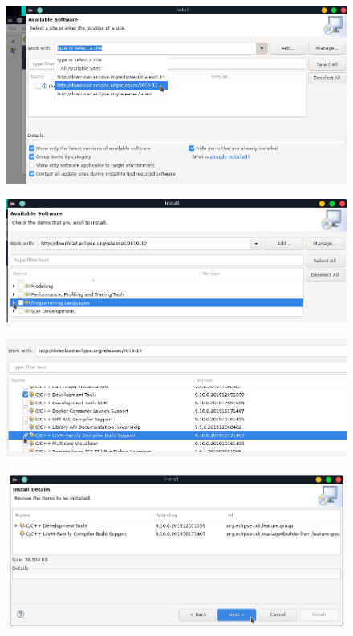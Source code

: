 \documentclass{article}
\begin{document}
\begin{figure}[h!]
  \centering
  \includegraphics[scale=0.7]{./Pictures/002_eclipse_cpp_repo.png}
\end{figure}

\newpage

\begin{figure}[h!]
  \centering
  \includegraphics[scale=0.75]{./Pictures/003_programming_repo.png}
\end{figure}

\begin{figure}[h!]
  \centering
  \includegraphics[scale=0.75]{./Pictures/004_paquetes.png}
\end{figure}

\begin{figure}[h!]
  \centering
  \includegraphics[scale=0.75]{./Pictures/005_next.png}
\end{figure}
\end{document}
